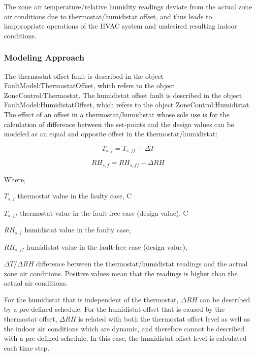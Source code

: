 The zone air temperature/relative humidity readings deviate from the actual zone air conditions due to thermostat/humidistat offset, and thus leads to inappropriate operations of the HVAC system and undesired resulting indoor conditions.

\subsubsection{Modeling Approach}\label{modeling-approach-1}

The thermostat offset fault is described in the object FaultModel:ThermostatOffset, which refers to the object ZoneControl:Thermostat. The humidistat offset fault is described in the object FaultModel:HumidistatOffset, which refers to the object ZoneControl:Humidistat. The effect of an offset in a thermostat/humidistat whose sole use is for the calculation of difference between the set-points and the design values can be modeled as an equal and opposite offset in the thermostat/humidistat:

\begin{equation}
T_{s,f} = T_{s,ff}  - \Delta T
\end{equation}

\begin{equation}
RH_{s,f} = RH_{s,ff}  - \Delta RH
\end{equation}

Where,

\(T_{s,f}\) thermostat value in the faulty case, C

\(T_{s,ff}\) thermostat value in the fault-free case (design value), C

\(RH_{s,f}\) humidistat value in the faulty case,

\(RH_{s,ff}\) humidistat value in the fault-free case (design value),

\(\Delta T / \Delta RH\) difference between the thermostat/humidistat readings and the actual zone air conditions. Positive values mean that the readings is higher than the actual air conditions.

For the humidistat that is independent of the thermostat, \(\Delta RH\) can be described by a pre-defined schedule. For the humidistat offset that is caused by the thermostat offset, \(\Delta RH\) is related with both the thermostat offset level as well as the indoor air conditions which are dynamic, and therefore cannot be described with a pre-defined schedule. In this case, the humidistat offset level is calculated each time step.

